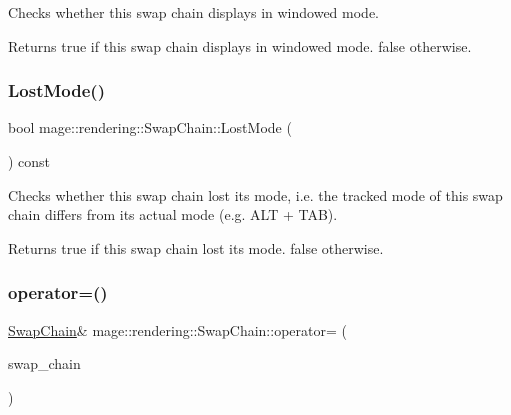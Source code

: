 Checks whether this swap chain displays in windowed mode.

\begin{DoxyReturn}{Returns}
{\ttfamily true} if this swap chain displays in windowed mode. {\ttfamily false} otherwise. 
\end{DoxyReturn}
\mbox{\label{classmage_1_1rendering_1_1_swap_chain_a8d4356d1652fca65095bc4db2bd0c1f2}} 
\subsubsection{\texorpdfstring{Lost\+Mode()}{LostMode()}}
{\footnotesize\ttfamily bool mage\+::rendering\+::\+Swap\+Chain\+::\+Lost\+Mode (\begin{DoxyParamCaption}{ }\end{DoxyParamCaption}) const\hspace{0.3cm}{\ttfamily [noexcept]}}

Checks whether this swap chain lost its mode, i.\+e. the tracked mode of this swap chain differs from its actual mode (e.\+g. A\+LT + T\+AB).

\begin{DoxyReturn}{Returns}
{\ttfamily true} if this swap chain lost its mode. {\ttfamily false} otherwise. 
\end{DoxyReturn}
\mbox{\label{classmage_1_1rendering_1_1_swap_chain_a44dfcabbd320aad76853522bd084d181}} 
\subsubsection{\texorpdfstring{operator=()}{operator=()}\hspace{0.1cm}{\footnotesize\ttfamily [1/2]}}
{\footnotesize\ttfamily \mbox{\hyperlink{classmage_1_1rendering_1_1_swap_chain}{Swap\+Chain}}\& mage\+::rendering\+::\+Swap\+Chain\+::operator= (\begin{DoxyParamCaption}\item[{const \mbox{\hyperlink{classmage_1_1rendering_1_1_swap_chain}{Swap\+Chain}} \&}]{swap\+\_\+chain }\end{DoxyParamCaption})\hspace{0.3cm}{\ttfamily [delete]}}

